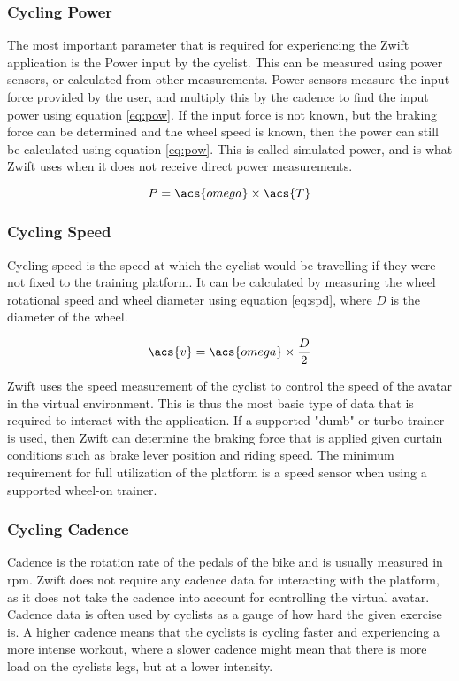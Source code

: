 \subsubsection{Cycling Power}
The most important parameter that is required for experiencing the Zwift application is the Power input by the cyclist. This can be measured using power sensors, or calculated from other measurements. Power sensors measure the input force provided by the user, and multiply this by the cadence to find the input power using equation \ref{eq:pow}. If the input force is not known, but the braking force can be determined and the wheel speed is known, then the power can still be calculated using equation \ref{eq:pow}. This is called simulated power, and is what Zwift uses when it does not receive direct power measurements.

\begin{equation}
	P = \acs{omega} \times \acs{T}
	\label{eq:pow}
\end{equation}

\subsubsection{Cycling Speed}
Cycling speed is the speed at which the cyclist would be travelling if they were not fixed to the training platform. It can be calculated by measuring the wheel rotational speed and wheel diameter using equation \ref{eq:spd}, where $D$ is the diameter of the wheel.

\begin{equation}
	\acs{v} = \acs{omega} \times \frac{D}{2}
	\label{eq:spd}
\end{equation}

Zwift uses the speed measurement of the cyclist to control the speed of the avatar in the virtual environment. This is thus the most basic type of data that is required to interact with the application. If a supported "dumb" or turbo trainer is used, then Zwift can determine the braking force that is applied given curtain conditions such as brake lever position and riding speed.
The minimum requirement for full utilization of the platform is a speed sensor when using a supported wheel-on trainer.

\subsubsection{Cycling Cadence}
Cadence is the rotation rate of the pedals of the bike and is usually measured in \ac{rpm}. Zwift does not require any cadence data for interacting with the platform, as it does not take the cadence into account for controlling the virtual avatar. Cadence data is often used by cyclists as a gauge of how hard the given exercise is. A higher cadence means that the cyclists is cycling faster and experiencing a more intense workout, where a slower cadence might mean that there is more load on the cyclists legs, but at a lower intensity.



